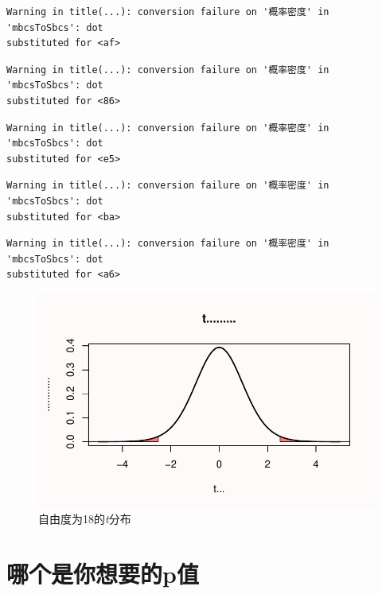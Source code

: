 \documentclass[
  letterpaper,
  DIV=11,
  numbers=noendperiod]{scrreprt}
\begin{document}
\begin{verbatim}
Warning in title(...): conversion failure on '概率密度' in 'mbcsToSbcs': dot
substituted for <af>
\end{verbatim}

\begin{verbatim}
Warning in title(...): conversion failure on '概率密度' in 'mbcsToSbcs': dot
substituted for <86>
\end{verbatim}

\begin{verbatim}
Warning in title(...): conversion failure on '概率密度' in 'mbcsToSbcs': dot
substituted for <e5>
\end{verbatim}

\begin{verbatim}
Warning in title(...): conversion failure on '概率密度' in 'mbcsToSbcs': dot
substituted for <ba>
\end{verbatim}

\begin{verbatim}
Warning in title(...): conversion failure on '概率密度' in 'mbcsToSbcs': dot
substituted for <a6>
\end{verbatim}

\begin{figure}

{\centering \includegraphics[width=1\textwidth,height=\textheight]{01-pvalue_files/figure-pdf/fig-tdist-1.pdf}

}

\caption{\label{fig-tdist}自由度为18的\emph{t}分布}

\end{figure}

\hypertarget{sec-whichpexpect}{%
\section{哪个是你想要的p值}\label{sec-whichpexpect}}
\end{document}
